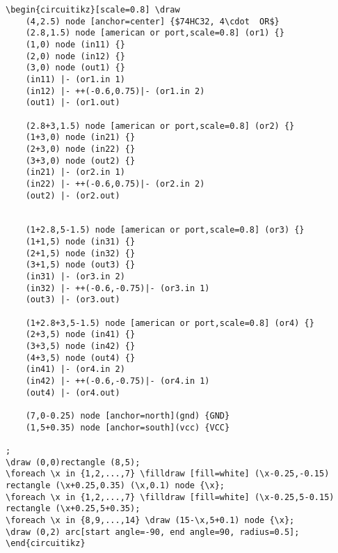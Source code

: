 \documentclass[a4paper,12pt,dvipsnames]{article}
\begin{document}
\begin{verbatim}
\begin{circuitikz}[scale=0.8] \draw
	(4,2.5) node [anchor=center] {$74HC32, 4\cdot  OR$}
	(2.8,1.5) node [american or port,scale=0.8] (or1) {}
	(1,0) node (in11) {}
	(2,0) node (in12) {}
	(3,0) node (out1) {}
	(in11) |- (or1.in 1)
	(in12) |- ++(-0.6,0.75)|- (or1.in 2)
	(out1) |- (or1.out)

	(2.8+3,1.5) node [american or port,scale=0.8] (or2) {}
	(1+3,0) node (in21) {}
	(2+3,0) node (in22) {}
	(3+3,0) node (out2) {}
	(in21) |- (or2.in 1)
	(in22) |- ++(-0.6,0.75)|- (or2.in 2)
	(out2) |- (or2.out)


	(1+2.8,5-1.5) node [american or port,scale=0.8] (or3) {}
	(1+1,5) node (in31) {}
	(2+1,5) node (in32) {}
	(3+1,5) node (out3) {}
	(in31) |- (or3.in 2)
	(in32) |- ++(-0.6,-0.75)|- (or3.in 1)
	(out3) |- (or3.out)

	(1+2.8+3,5-1.5) node [american or port,scale=0.8] (or4) {}
	(2+3,5) node (in41) {}
	(3+3,5) node (in42) {}
	(4+3,5) node (out4) {}
	(in41) |- (or4.in 2)
	(in42) |- ++(-0.6,-0.75)|- (or4.in 1)
	(out4) |- (or4.out)

	(7,0-0.25) node [anchor=north](gnd) {GND}
	(1,5+0.35) node [anchor=south](vcc) {VCC}

;
\draw (0,0)rectangle (8,5);
\foreach \x in {1,2,...,7} \filldraw [fill=white] (\x-0.25,-0.15) rectangle (\x+0.25,0.35) (\x,0.1) node {\x};
\foreach \x in {1,2,...,7} \filldraw [fill=white] (\x-0.25,5-0.15) rectangle (\x+0.25,5+0.35);
\foreach \x in {8,9,...,14} \draw (15-\x,5+0.1) node {\x};
\draw (0,2) arc[start angle=-90, end angle=90, radius=0.5];
\end{circuitikz}
\end{verbatim}
\end{document}
